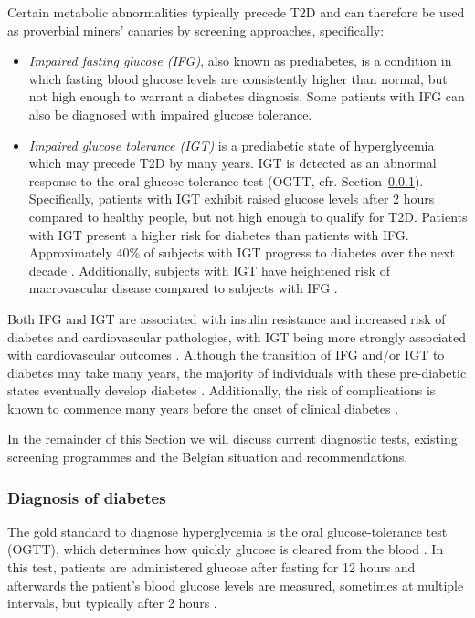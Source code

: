 Certain metabolic abnormalities typically precede T2D and can therefore be used as proverbial miners' canaries by screening approaches, specifically:
\begin{itemize}
\item \emph{Impaired fasting glucose (IFG)}, also known as prediabetes, is a condition in which fasting blood glucose levels are consistently higher than normal, but not high enough to warrant a diabetes diagnosis. Some patients with IFG can also be diagnosed with impaired glucose tolerance.
\item \emph{Impaired glucose tolerance (IGT)} is a prediabetic state of hyperglycemia which may precede T2D by many years. IGT is detected as an abnormal response to the oral glucose tolerance test (OGTT, cfr. Section~\ref{diagnosis-diabetes}). Specifically, patients with IGT exhibit raised glucose levels after 2 hours compared to healthy people, but not high enough to qualify for T2D. Patients with IGT present a higher risk for diabetes than patients with IFG. Approximately $40\%$ of subjects with IGT progress to diabetes over the next decade \citep{zimmet2001global}. Additionally, subjects with IGT have heightened risk of macrovascular disease compared to subjects with IFG \citep{tominaga1999impaired, unwin2002impaired}.
\end{itemize}
Both IFG and IGT are associated with insulin resistance and increased risk of diabetes and cardiovascular pathologies, with IGT being more strongly associated with cardiovascular outcomes \citep{unwin2002impaired}. Although the transition of IFG and/or IGT to diabetes may take many years, the majority of individuals with these pre-diabetic states eventually develop diabetes \cite{tuomilehto2001prevention,diabetes2002reduction,nathan2007impaired}. Additionally, the risk of complications is known to commence many years before the onset of clinical diabetes \cite{haffner1990cardiovascular,zimmet2001global}.

In the remainder of this Section we will discuss current diagnostic tests, existing screening programmes and the Belgian situation and recommendations.



\subsubsection{Diagnosis of diabetes} \label{diagnosis-diabetes}
The gold standard to diagnose hyperglycemia is the oral glucose-tolerance test (OGTT), which determines how quickly glucose is cleared from the blood \citep{alberti1998definition, world2006definition}. In this test, patients are administered glucose after fasting for 12 hours and afterwards the patient's blood glucose levels are measured, sometimes at multiple intervals, but typically after 2 hours \citep{diabetesliga}.


